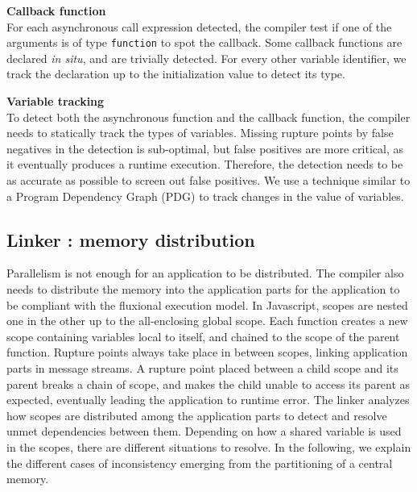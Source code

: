 \textbf{Callback function}\\
For each asynchronous call expression detected, the compiler test if one of the arguments is of type \texttt{function} to spot the callback.
Some callback functions are declared \textit{in situ}, and are trivially detected.
For every other variable identifier, we track the declaration up to the initialization value to detect its type.

\textbf{Variable tracking}\\
To detect both the asynchronous function and the callback function, the compiler needs to statically track the types of variables.
Missing rupture points by false negatives in the detection is sub-optimal, but false positives are more critical, as it eventually produces a runtime execution.
Therefore, the detection needs to be as accurate as possible to screen out false positives.
We use a technique similar to a Program Dependency Graph (PDG)\cite{Ferrante1987} to track changes in the value of variables.


\subsection{Linker : memory distribution} \label{section:linker}

Parallelism is not enough for an application to be distributed.
The compiler also needs to distribute the memory into the application parts for the application to be compliant with the fluxional execution model.
In Javascript, scopes are nested one in the other up to the all-enclosing global scope.
Each function creates a new scope containing variables local to itself, and chained to the scope of the parent function.
Rupture points always take place in between scopes, linking application parts in message streams.
A rupture point placed between a child scope and its parent breaks a chain of scope, and makes the child unable to access its parent as expected, eventually leading the application to runtime error.
The linker analyzes how scopes are distributed among the application parts to detect and resolve unmet dependencies between them.
Depending on how a shared variable is used in the scopes, there are different situations to resolve.
In the following, we explain the different cases of inconsistency emerging from the partitioning of a central memory.

